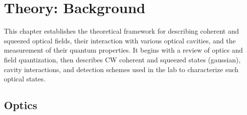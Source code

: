 \newcommand{\adag}[1]{\hat{a}_{#1}^\dagger}
\newcommand{\aop}[1]{\hat{a}_{#1\vphantom{\dagger}}}
\chapter{Theory: Background} \label{chap:theory}
This chapter establishes the theoretical framework for describing coherent and squeezed optical fields, their interaction with various optical cavities, and the measurement of their quantum properties. It begins with a review of optics and field quantization, then describes CW coherent and squeezed states (gaussian), cavity interactions, and detection schemes used in the lab to characterize such optical states. 
\minitoc
\newpage
\section{Optics}
